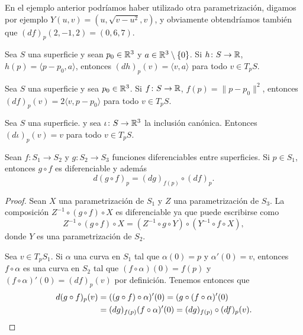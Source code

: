 En el ejemplo anterior podríamos haber utilizado otra parametrización, digamos
por ejemplo $Y(u,v)=(u,\sqrt{v-u^2},v)$, y obviamente obtendríamos también que
$(df)_p(2,-1,2)=(0,6,7)$. 

\begin{example}
	Sea $S$ una superficie y 
	sean $p_0\in\mathbb{R}^3$ y $a\in\mathbb{R}^3\setminus\{0\}$. Si  
	$h\colon S\to\mathbb{R}$, $h(p)=\langle p-p_0,a\rangle$, entonces
	$(dh)_p(v)=\langle v,a\rangle$ para todo $v\in T_pS$. 
\end{example}

\begin{example}
	Sea $S$ una superficie y 
	sea $p_0\in\mathbb{R}^3$. Si $f\colon S\to\mathbb{R}$, $f(p)=\|p-p_0\|^2$, entonces
	$(df)_p(v)=2\langle v,p-p_0\rangle$ para todo $v\in T_pS$. 
\end{example}

\begin{example}
	Sea $S$ una superficie. 
	y sea $\iota\colon S\to\mathbb{R}^3$ la inclusión canónica. Entonces
	$(d\iota)_p(v)=v$ 
	para todo $v\in T_pS$. 
\end{example}

\begin{theorem}
	\label{thm:chain_rule} 
	Sean $f\colon S_1\to S_2$ y $g\colon S_2\to S_3$ funciones diferenciables
	entre superficies. Si $p\in S_1$, entonces $g\circ f$ es diferenciable y además 
	\[
		d(g\circ f)_p=(dg)_{f(p)}\circ (df)_p.
	\]
\end{theorem}

\begin{proof}
	Sean $X$ una parametrización de $S_1$ y $Z$ una parametrización de $S_3$. 
	La composición $Z^{-1}\circ (g\circ f)\circ X$ es diferenciable ya que puede escribirse como
	\[
		Z^{-1}\circ (g\circ f)\circ X=(Z^{-1}\circ g\circ Y)\circ (Y^{-1}\circ f\circ X),
	\]
	donde $Y$ es una parametrización de $S_2$.

	Sea $v\in T_pS_1$.  Si $\alpha$ una curva en $S_1$ tal que $\alpha(0)=p$ y
	$\alpha'(0)=v$, entonces $f\circ\alpha$ es una curva en $S_2$
	tal que $(f\circ\alpha)(0)=f(p)$ y $(f\circ\alpha)'(0)=(df)_p(v)$ por
	definición. Tenemos entonces que 
	\begin{align*}
		d(g\circ f)_p(v)&=((g\circ f)\circ\alpha)'(0)=(g\circ (f\circ\alpha)'(0)\\
		&=(dg)_{f(p)}(f\circ\alpha)'(0)=(dg)_{f(p)}\circ (df)_p(v).\qedhere
	\end{align*}
\end{proof}

